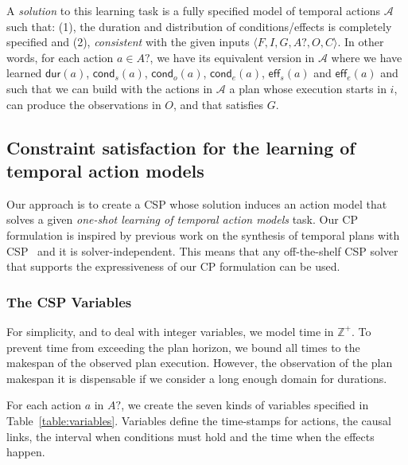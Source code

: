 \documentclass{ecai}
\newcommand{\tup}[1]{{\langle #1 \rangle}}
\newcommand{\eff}{\mathsf{eff}}    %
\newcommand{\cond}{\mathsf{cond}}  %
\newcommand{\dur}{\mathsf{dur}}    %
\begin{document}
A {\em solution} to this learning task is a fully specified model of temporal actions $\mathcal{A}$ such that: (1), the duration and distribution of conditions/effects is completely specified and (2), {\em consistent} with the given inputs $\tup{F,I,G,A?,O,C}$. In other words, for each action $a \in A?$, we have its equivalent version in $\mathcal{A}$ where we have learned $\dur(a)$, $\cond_s(a)$, $\cond_o(a)$, $\cond_e(a)$, $\eff_s(a)$ and $\eff_e(a)$ and such that we can build with the actions in $\mathcal{A}$ a plan whose execution starts in $i$, can produce the observations in $O$, and that satisfies $G$. 

\subsection{Constraint satisfaction for the learning of temporal action models}
\label{subsec:CPformulation}

Our approach is to create a CSP whose solution induces an action model that solves a given {\em one-shot learning of temporal action models} task. Our CP formulation is inspired by previous work on the synthesis of temporal plans with CSP~\cite{garrido2009constraint} and it is solver-independent. This means that any off-the-shelf CSP solver that supports the expressiveness of our CP formulation can be used.

\subsubsection{The CSP Variables}
For simplicity, and to deal with integer variables, we model time in $\mathbb{Z}^+$. To prevent time from exceeding the plan horizon, we bound all times to the makespan of the observed plan execution. However, the observation of the plan makespan it is dispensable if we consider a long enough domain for durations.

For each action $a$ in $A?$, we create the seven kinds of variables specified in Table~\ref{table:variables}. Variables define the time-stamps for actions, the causal links, the interval when conditions must hold and the time when the effects happen.
\end{document}
